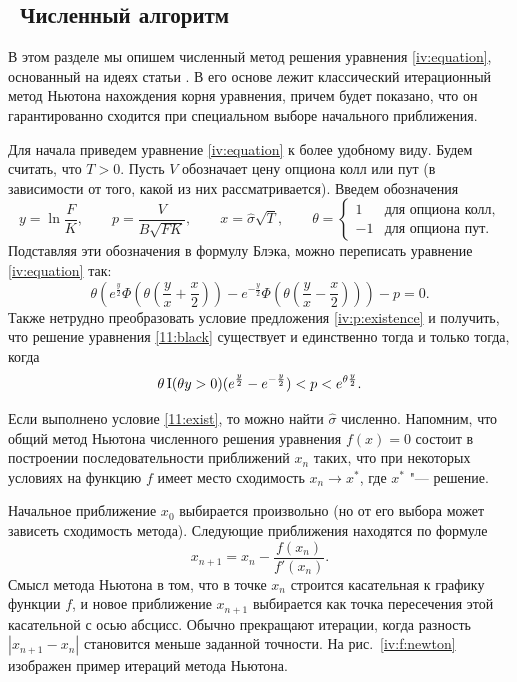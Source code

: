 \subsection{\difficult\ Численный алгоритм}
\label{iv:ss:algorithm}
В этом разделе мы опишем численный метод решения уравнения \eqref{iv:equation}, основанный на идеях статьи \cite{Jaeckel06}.
В его основе лежит классический итерационный метод Ньютона нахождения корня уравнения, причем будет показано, что он гарантированно сходится при специальном выборе начального приближения. 

Для начала приведем уравнение \eqref{iv:equation} к более удобному виду.
Будем считать, что $T>0$.
Пусть $V$ обозначает цену опциона колл или пут (в зависимости от того, какой из них рассматривается).
Введем обозначения
\[
y = \ln\frac FK, \qquad
p = \frac{V}{B\sqrt{FK}}, \qquad
x = \hat\sigma\sqrt{T},\qquad
\theta=\begin{cases}
  1 &\text{для опциона колл},\\
  -1 &\text{для опциона пут}.
\end{cases}
\]
Подставляя эти обозначения в формулу Блэка, можно переписать уравнение \eqref{iv:equation} так:
\begin{equation}
\label{11:black}
\theta\left(e^{\frac y2}\Phi\left(\theta\left(\frac yx + \frac x2\right)\right) - e^{-\frac y2}\Phi\left(\theta \left(\frac yx - \frac x2\right)\right)\right) - p=0.
\end{equation}
Также нетрудно преобразовать условие предложения \ref{iv:p:existence} и получить, что решение уравнения \eqref{11:black} существует и единственно тогда и только тогда, когда
\begin{equation}
\label{11:exist}
\theta \operatorname{I}(\theta y>0) (e^{\frac y2} - e^{-\frac y2}) < p < e^{\theta \frac y2}.
\end{equation}

Если выполнено условие \eqref{11:exist}, то можно найти $\hat\sigma$ численно.
Напомним, что общий метод Ньютона численного решения уравнения $f(x) = 0$ состоит в построении последовательности приближений $x_n$ таких, что при некоторых условиях на функцию $f$ имеет место сходимость $x_n\to x^*$, где $x^*$ "--- решение.

Начальное приближение $x_0$ выбирается произвольно (но от его выбора может зависеть сходимость метода).
Следующие приближения находятся по формуле
\[
x_{n+1} = x_n - \frac{f(x_n)}{f'(x_n)}.
\]
Смысл метода Ньютона в том, что в точке $x_n$ строится касательная к графику функции $f$, и новое приближение $x_{n+1}$ выбирается как точка пересечения этой касательной с осью абсцисс.
Обычно прекращают итерации, когда разность $|x_{n+1}-x_n|$ становится меньше заданной точности.
На рис.~\ref{iv:f:newton} изображен пример итераций метода Ньютона.

